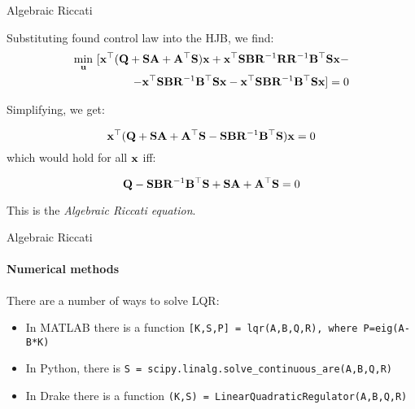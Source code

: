 \documentclass{beamer}
\begin{document}
\begin{frame}{Algebraic Riccati}
\begin{flushleft}

Substituting found control law into the HJB, we find:
\begin{equation}
\begin{split}
\underset{\bo{u}}{\min} \ 
[ 
\bo{x}^\top (
\bo{Q} + \bo{S} \bo{A} + \bo{A}^\top \bo{S}
)\bo{x}
+
\bo{x}^\top \bo{S} \bo{B} \bo{R}^{-1} \bo{R} \mathbf  R^{-1} \bo{B}^\top \bo{S} \bo{x}
- \\
- 
\bo{x}^\top \bo{S} \bo{B} \bo{R}^{-1} \bo{B}^\top \bo{S} \bo{x}
- 
\bo{x}^\top\bo{S} \bo{B} \bo{R}^{-1} \bo{B}^\top \bo{S} \bo{x} 
] = 0
\end{split}
\end{equation}

Simplifying, we get: 

\begin{equation}
\mathbf{x}^\top (\mathbf{Q} + \mathbf{S} \mathbf{A} + \mathbf{A}^\top \mathbf{S}
- \mathbf{S} \mathbf{B} \mathbf{R}^{-1} \mathbf{B}^\top \mathbf{S}) \mathbf{x} = 0
\end{equation}
%
which would hold for all $\mathbf{x}$ iff:
%

\begin{equation}
\mathbf{Q} - \mathbf{S} \mathbf{B} \mathbf{R}^{-1} \mathbf{B}^\top \mathbf{S} 
 + \mathbf{S} \mathbf{A} + \mathbf{A}^\top \mathbf{S} = 0
\end{equation}

This is the \emph{Algebraic Riccati equation}.

\end{flushleft}
\end{frame}



\begin{frame}{Algebraic Riccati}
\framesubtitle{Numerical methods}
\begin{flushleft}

There are a number of ways to solve LQR:

\bigskip

\begin{itemize}
    \item In MATLAB there is a function \texttt{[K,S,P] = lqr(A,B,Q,R), where P=eig(A-B*K)}
    \item In Python, there is \texttt{S = scipy.linalg.solve\_continuous\_are(A,B,Q,R)}
    \item In Drake there is a function \texttt{(K,S) = LinearQuadraticRegulator(A,B,Q,R)}
\end{itemize}

\end{flushleft}
\end{frame}
\end{document}
